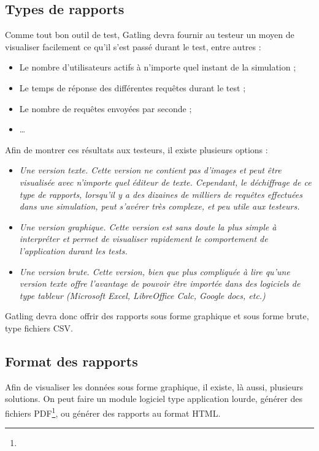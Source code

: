 \subsection{Types de rapports}

Comme tout bon outil de test, Gatling devra fournir au testeur un moyen de visualiser facilement ce qu'il s'est passé durant le test, entre autres :
\begin{itemize}
  \item Le nombre d'utilisateurs actifs à n'importe quel instant de la simulation ;
  \item Le temps de réponse des différentes requêtes durant le test ;
  \item Le nombre de requêtes envoyées par seconde ;
  \item \ldots
\end{itemize}

Afin de montrer ces résultats aux testeurs, il existe plusieurs options : 
\begin{itemize}
  \item \em{Une version texte}. Cette version ne contient pas d'images et peut être visualisée avec n'importe quel éditeur de texte. Cependant, le déchiffrage de ce type de rapports, lorsqu'il y a des dizaines de milliers de requêtes effectuées dans une simulation, peut s'avérer très complexe, et peu utile aux testeurs.
  \item \em{Une version graphique}. Cette version est sans doute la plus simple à interpréter et permet de visualiser rapidement le comportement de l'application durant les tests.
  \item \em{Une version brute}. Cette version, bien que plus compliquée à lire qu'une version texte offre l'avantage de pouvoir être importée dans des logiciels de type tableur (Microsoft Excel, LibreOffice Calc, Google docs, etc.)
\end{itemize}

Gatling devra donc offrir des rapports sous forme graphique et sous forme brute, type fichiers CSV.

\subsection{Format des rapports}

Afin de visualiser les données sous forme graphique, il existe, là aussi, plusieurs solutions. On peut faire un module logiciel type application lourde, générer des fichiers PDF\footnote{}, ou générer des rapports au format HTML. 

